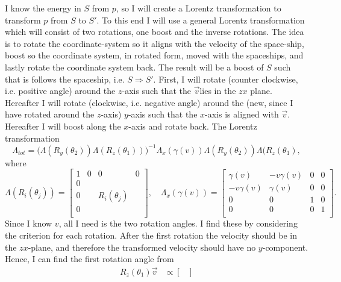 \begin{example}
\begin{enumerate}
		I know the energy in $S$ from $p$, so I will create a Lorentz transformation to transform $p$ from $S$ to $S'$. To this end I will use a general Lorentz transformation which will consist of two rotations, one boost and the inverse rotations. The idea is to rotate the coordinate-system so it aligns with the velocity of the space-ship, boost so the coordinate system, in rotated form, moved with the spaceships, and lastly rotate the coordinate system back. The result will be a boost of $S$ such that is follows the spaceship, i.e. $S\Rightarrow S'$. First, I will rotate (counter clockwise, i.e. positive angle) around the $z$-axis such that the $\vec{v}$lies in the $zx$ plane. Hereafter I will rotate (clockwise, i.e. negative angle) around the (new, since I have rotated around the $z$-axis) $y$-axis such that the $x$-axis is aligned with $\vec{v}$. Hereafter I will boost along the $x$-axis and rotate back. The Lorentz transformation
		\begin{equation}
			\Lambda_{tot}=\big(\Lambda(R_y(\theta_2))\Lambda(R_z(\theta_1))\big)^{-1}\Lambda_x(\gamma(v))\Lambda(R_y(\theta_2))\Lambda(R_z(\theta_1),
		\end{equation} 
		where
		\begin{equation}
			\Lambda(R_i(\theta_j))=\begin{bmatrix}
				1 & 0 & 0 & 0\\
				0 &   &   &   \\
				0 &   & R_i(\theta_j) & \\
				0 &   &   & \\
			\end{bmatrix}, \quad \Lambda_x(\gamma(v))=\begin{bmatrix}
				\gamma(v)&-v\gamma(v)&0&0\\
				-v\gamma(v)&\gamma(v)&0&0\\
				0&0&1&0\\
				0&0&0&1\\
			\end{bmatrix}.
		\end{equation} 
		Since I know $v$, all I need is the two rotation angles. I find these by considering the criterion for each rotation. After the first rotation the velocity should be in the $zx$-plane, and therefore the transformed velocity should have no $y$-component. Hence, I can find the first rotation angle from
		\begin{equation}
			\begin{split}
				R_z(\theta_1)\vec{v}&\propto\begin{bmatrix}

\end{bmatrix}
\end{split}
\end{equation}
\end{enumerate}
\end{example}
